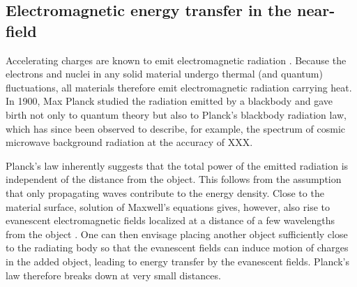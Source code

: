 







\subsection{Electromagnetic energy transfer in the near-field}
\label{sec:intro_em}
Accelerating charges are known to emit electromagnetic radiation \cite{}. Because the electrons and nuclei in any solid material undergo thermal (and quantum) fluctuations, all materials therefore emit electromagnetic radiation carrying heat. In 1900, Max Planck \cite{planck00a} studied the radiation emitted by a blackbody and gave birth not only to quantum theory but also to Planck's blackbody radiation law, which has since been observed to describe, for example, the spectrum of cosmic microwave background radiation at the accuracy of XXX.

Planck's law inherently suggests that the total power of the emitted radiation is independent of the distance from the object. This follows from the assumption that only propagating waves contribute to the energy density. Close to the material surface, solution of Maxwell's equations gives, however, also rise to evanescent electromagnetic fields localized at a distance of a few wavelengths from the object \cite{polder71}. One can then envisage placing another object sufficiently close to the radiating body so that the evanescent fields can induce motion of charges in the added object, leading to energy transfer by the evanescent fields. Planck's law therefore breaks down at very small distances. 

